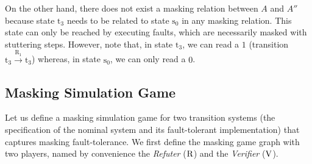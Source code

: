 \begin{exa}
On the other hand, there does not exist a masking relation between $A$ and $A''$ because state $\text{t}_3$ needs to be related to state $\text{s}_0$ in any masking relation. This  state can only be reached by executing faults, which are necessarily masked with stuttering steps. However, note that, in state  $\text{t}_3$, we can read a $1$ (transition $\text{t}_3 \xrightarrow{\text{R}_1} \text{t}_3$) whereas, in state $\text{s}_0$, we can only read a $0$.
\end{exa}
 
\subsection{Masking Simulation Game} \label{subsec:mask_sim_game}
	Let us define a masking simulation game for two transition systems (the
specification of the nominal system and its fault-tolerant
implementation) that captures masking fault-tolerance.  We first
define the masking game graph with two players, named by
convenience the \emph{Refuter} ($\mathrm{R}$) and the \emph{Verifier}
($\mathrm{V}$).

